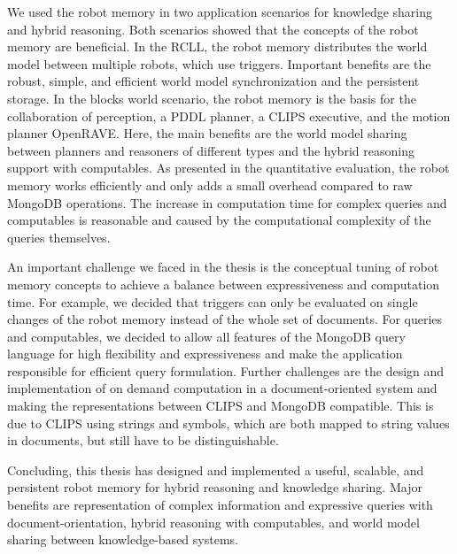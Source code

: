 We used the robot memory in two application scenarios for knowledge
sharing and hybrid reasoning. Both scenarios showed that the concepts
of the robot memory are beneficial. In the RCLL, the robot memory
distributes the world model between multiple robots, which use
triggers. Important benefits are the robust, simple, and efficient
world model synchronization and the persistent storage. In the blocks
world scenario, the robot memory is the basis for the collaboration of
perception, a PDDL planner, a CLIPS executive, and the motion planner
OpenRAVE. Here, the main benefits are the world model sharing between
planners and reasoners of different types and the hybrid reasoning
support with computables.  As presented in the quantitative
evaluation, the robot memory works efficiently and only adds a small
overhead compared to raw MongoDB operations. The increase in
computation time for complex queries and computables is reasonable and
caused by the computational complexity of the queries themselves.

An important challenge we faced in the thesis is the conceptual
tuning of robot memory concepts to achieve a balance between
expressiveness and computation time. For example, we decided that
triggers can only be evaluated on single changes of the robot memory
instead of the whole set of documents. For queries and computables, we
decided to allow all features of the MongoDB query language for high
flexibility and expressiveness and make the application responsible
for efficient query formulation.  Further challenges are the design
and implementation of on demand computation in a document-oriented
system and making the representations between CLIPS and MongoDB
compatible. This is due to CLIPS using strings and symbols, which are
both mapped to string values in documents, but still have to be
distinguishable.

Concluding, this thesis has designed and implemented a useful,
scalable, and persistent robot memory for hybrid reasoning and
knowledge sharing. Major benefits are representation of
complex information and expressive queries with document-orientation,
hybrid reasoning with computables, and world model sharing between
knowledge-based systems.

